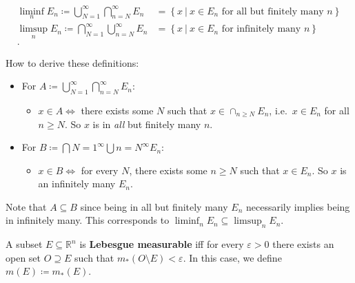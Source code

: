 \begin{definition}

\begin{align*}
\liminf_{n} E_{n} \coloneqq\displaystyle\bigcup_{N=1}^\infty \displaystyle\bigcap_{n=N}^\infty E_{n} &= \left\{{x {~\mathrel{\Big|}~}x\in E_{n} \text{ for all but finitely many } n}\right\}  \\
\limsup_{n} E_{n} \coloneqq\displaystyle\bigcap_{N=1}^\infty \displaystyle\bigcup_{n=N}^{\infty} E_{n} &= \left\{{x {~\mathrel{\Big|}~}x\in E_{n} \text{ for infinitely many } n}\right\}  \\
.\end{align*}

How to derive these definitions:

\begin{itemize}
\tightlist
\item
  For
  \(A \coloneqq\displaystyle\bigcup_{N=1}^\infty \displaystyle\bigcap_{n=N}^\infty E_n\):

  \begin{itemize}
  \tightlist
  \item
    \(x\in A \iff\) there exists some \(N\) such that
    \(x\in \cap_{n\geq N} E_n\), i.e.~\(x\in E_n\) for all \(n\geq N\).
    So \(x\) is in \emph{all} but finitely many \(n\).
  \end{itemize}
\item
  For
  \(B \coloneqq\displaystyle\bigcap{N=1}^\infty \displaystyle\bigcup{n=N}^\infty E_n\):

  \begin{itemize}
  \tightlist
  \item
    \(x\in B \iff\) for every \(N\), there exists some \(n\geq N\) such
    that \(x\in E_n\). So \(x\) is an infinitely many \(E_n\).
  \end{itemize}
\end{itemize}

Note that \(A\subseteq B\) since being in all but finitely many \(E_n\)
necessarily implies being in infinitely many. This corresponds to
\(\liminf_n E_n \subseteq \limsup_n E_n\).

\end{definition}

\begin{definition}

A subset \(E\subseteq {\mathbb{R}}^n\) is \textbf{Lebesgue measurable}
iff for every \({\varepsilon}> 0\) there exists an open set
\(O \supseteq E\) such that \(m_*(O\setminus E) < {\varepsilon}\). In
this case, we define \(m(E) \coloneqq m_*(E)\).

\end{definition}

